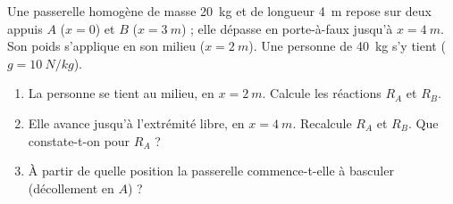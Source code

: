 \documentclass[11pt,a4paper]{article}
\begin{document}
\begin{exo}
Une passerelle homogène de masse \qty{20}{kg} et de longueur \qty{4}{m} repose sur deux appuis $A$
($x=0$) et $B$ ($x=\qty{3}{m}$) ; elle dépasse en porte-à-faux jusqu'à $x=\qty{4}{m}$. Son poids
s'applique en son milieu ($x=\qty{2}{m}$). Une personne de \qty{40}{kg} s'y tient ($g=\qty{10}{N/kg}$).
\begin{center}
\end{center}
\begin{enumerate}[label=\alph*)]
  \item La personne se tient au milieu, en $x=\qty{2}{m}$. Calcule les réactions $R_A$ et $R_B$.
  \item Elle avance jusqu'à l'extrémité libre, en $x=\qty{4}{m}$. Recalcule $R_A$ et $R_B$. Que
        constate-t-on pour $R_A$ ?
  \item À partir de quelle position la passerelle commence-t-elle à basculer (décollement en $A$) ?
\end{enumerate}
\end{exo}
\end{document}
